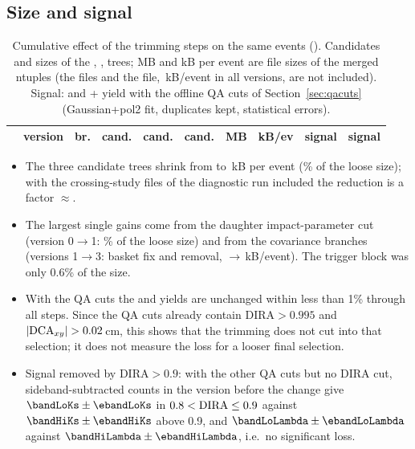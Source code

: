 \subsection{Size and signal}
\begin{table}[H]
\centering\footnotesize
\setlength\tabcolsep{4pt}
\caption{Cumulative effect of the trimming steps on the same \trimNev{} events
(). Candidates and sizes of the \Ks, \Lam, \Dzero{} trees; MB and kB per
event are file sizes of the merged ntuples (the  files and the 
file, \trimEvInfoKB\,kB/event in all versions, are not included). Signal: \Ks{} and \Lam+\aLam{}
yield with the offline QA cuts of Section~\ref{sec:qacuts} (Gaussian+pol2 fit, duplicates kept,
statistical errors).}
\label{tab:trim}
\begin{tabular}{rp{}rrrrrrrr}
\toprule
 & version & br. & \Ks{} cand. & \Lam{} cand. & \Dzero{} cand. & MB & kB/ev & \Ks{} signal & \Lam{} signal \\
\midrule

\bottomrule
\end{tabular}
\end{table}

\begin{itemize}\setlength\itemsep{1pt}
\item The three candidate trees shrink from \trimKBLoose{} to \trimKBDira\,kB per event (\trimFracDira\%
  of the loose size); with the crossing-study files of the diagnostic run included the reduction is a
  factor $\approx$\trimTotalReduction.
\item The largest single gains come from the daughter impact-parameter cut (version 0$\to$1:
  \trimFracProd\% of the loose size) and from the covariance branches (versions 1$\to$3: basket fix and
  removal, \trimKBProd$\to$\trimKBNoCov\,kB/event). The trigger block was only 0.6\% of the size.
\item With the QA cuts the \Ks{} and \Lam{} yields are unchanged within less than 1\% through all steps.
  Since the QA cuts already contain DIRA$>0.995$ and $|{\rm DCA}_{xy}|>0.02$\,cm, this shows that the
  trimming does not cut into that selection; it does not measure the loss for a looser final selection.
\item Signal removed by DIRA$>0.9$: with the other QA cuts but no DIRA cut, sideband-subtracted counts in
  the version before the change give \Ks{} $\bandLoKs\pm\ebandLoKs$ in $0.8<{\rm DIRA}\leq0.9$ against
  $\bandHiKs\pm\ebandHiKs$ above 0.9, and \Lam{} $\bandLoLambda\pm\ebandLoLambda$ against
  $\bandHiLambda\pm\ebandHiLambda$, i.e.\ no significant loss.
\end{itemize}

